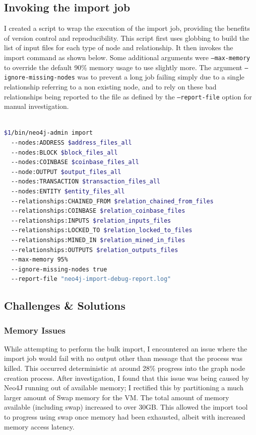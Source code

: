 \subsection{Invoking the import job}
I created a script to wrap the execution of the import job, providing the benefits of version control and reproducibility. This script first uses globbing to build the list of input files for each type of node and relationship. It then invokes the import command as shown below. Some additional arguments were \texttt{--max-memory} to override the default 90\% memory usage to use slightly more. The argument \texttt{--ignore-missing-nodes} was to prevent a long job failing simply due to a single relationship referring to a non existing node, and to rely on these bad relationships being reported to the file as defined by the \texttt{--report-file} option for manual investigation. 
\\\\
\begin{lstlisting}[language=Bash]
$1/bin/neo4j-admin import 
  --nodes:ADDRESS $address_files_all
  --nodes:BLOCK $block_files_all
  --nodes:COINBASE $coinbase_files_all
  --node:OUTPUT $output_files_all
  --nodes:TRANSACTION $transaction_files_all 
  --nodes:ENTITY $entity_files_all
  --relationships:CHAINED_FROM $relation_chained_from_files 
  --relationships:COINBASE $relation_coinbase_files 
  --relationships:INPUTS $relation_inputs_files 
  --relationships:LOCKED_TO $relation_locked_to_files 
  --relationships:MINED_IN $relation_mined_in_files 
  --relationships:OUTPUTS $relation_outputs_files 
  --max-memory 95% 
  --ignore-missing-nodes true 
  --report-file "neo4j-import-debug-report.log" 
\end{lstlisting}

\subsection{Challenges \& Solutions}\label{neo4j-challenges}
\subsubsection{Memory Issues}
While attempting to perform the bulk import, I encountered an issue where the import job would fail with no output other than message that the process was killed. This occurred deterministic at around 28\% progress into the graph node creation process. After investigation, I found that this issue was being caused by Neo4J running out of available memory; I rectified this by partitioning a much larger amount of Swap memory for the VM. The total amount of memory available (including swap) increased to over 30GB. This allowed the import tool to progress using swap once memory had been exhausted, albeit with increased memory access latency.

